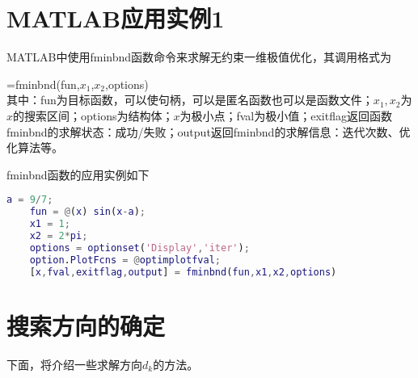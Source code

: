 \section{MATLAB应用实例1}
    \par
    MATLAB中使用fminbnd函数命令来求解无约束一维极值优化，其调用格式为
    \par
    [x,fval,exitflag,output]=fminbnd(fun,$x_1$,$x_2$,options) \\
    其中：fun为目标函数，可以使句柄，可以是匿名函数也可以是函数文件；$x_1,x_2$为$x$的搜索区间；options为结构体；$x$为极小点；fval为极小值；exitflag返回函数fminbnd的求解状态：成功/失败；output返回fminbnd的求解信息：迭代次数、优化算法等。
    \par
    fminbnd函数的应用实例如下
    \begin{lstlisting}[language = Matlab]
    a = 9/7;
    fun = @(x) sin(x-a);
    x1 = 1;
    x2 = 2*pi;
    options = optionset('Display','iter');
    option.PlotFcns = @optimplotfval;
    [x,fval,exitflag,output] = fminbnd(fun,x1,x2,options)
    \end{lstlisting}
\section{搜索方向的确定}
    下面，将介绍一些求解方向$d_k$的方法。
